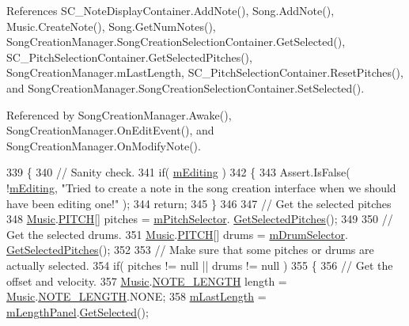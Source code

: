 References S\+C\+\_\+\+Note\+Display\+Container.\+Add\+Note(), Song.\+Add\+Note(), Music.\+Create\+Note(), Song.\+Get\+Num\+Notes(), Song\+Creation\+Manager.\+Song\+Creation\+Selection\+Container.\+Get\+Selected(), S\+C\+\_\+\+Pitch\+Selection\+Container.\+Get\+Selected\+Pitches(), Song\+Creation\+Manager.\+m\+Last\+Length, S\+C\+\_\+\+Pitch\+Selection\+Container.\+Reset\+Pitches(), and Song\+Creation\+Manager.\+Song\+Creation\+Selection\+Container.\+Set\+Selected().



Referenced by Song\+Creation\+Manager.\+Awake(), Song\+Creation\+Manager.\+On\+Edit\+Event(), and Song\+Creation\+Manager.\+On\+Modify\+Note().


\begin{DoxyCode}
339     \{
340         \textcolor{comment}{// Sanity check.}
341         \textcolor{keywordflow}{if}( \hyperlink{group___s_c_m_priv_var_gad2a61787c63fb8770d3c8100adfae9cf}{mEditing} )
342         \{
343             Assert.IsFalse( !\hyperlink{group___s_c_m_priv_var_gad2a61787c63fb8770d3c8100adfae9cf}{mEditing}, \textcolor{stringliteral}{"Tried to create a note in the song creation interface when
       we should have been editing one!"} );
344             \textcolor{keywordflow}{return};
345         \}
346 
347         \textcolor{comment}{// Get the selected pitches}
348         \hyperlink{class_music}{Music}.\hyperlink{group___music_enums_ga508f69b199ea518f935486c990edac1d}{PITCH}[] pitches = \hyperlink{group___s_c_m_priv_var_gab84821120cace4099edfb42c52d2af63}{mPitchSelector}.
      \hyperlink{group___s_c___p_s_c_pub_func_ga05750cc6e1199f1522f8b87d6579dc34}{GetSelectedPitches}();
349 
350         \textcolor{comment}{// Get the selected drums.}
351         \hyperlink{class_music}{Music}.\hyperlink{group___music_enums_ga508f69b199ea518f935486c990edac1d}{PITCH}[] drums = \hyperlink{group___s_c_m_priv_var_gac8be873b8259a0ddf76b4fa6d7d2d072}{mDrumSelector}.
      \hyperlink{group___s_c___p_s_c_pub_func_ga05750cc6e1199f1522f8b87d6579dc34}{GetSelectedPitches}();
352 
353         \textcolor{comment}{// Make sure that some pitches or drums are actually selected.}
354         \textcolor{keywordflow}{if}( pitches != null || drums != null )
355         \{
356             \textcolor{comment}{// Get the offset and velocity.}
357             \hyperlink{class_music}{Music}.\hyperlink{group___music_enums_gaf11b5f079adbb21c800b9eca1c5c3cbd}{NOTE\_LENGTH} length = \hyperlink{class_music}{Music}.\hyperlink{group___music_enums_gaf11b5f079adbb21c800b9eca1c5c3cbd}{NOTE\_LENGTH}.NONE;
358             \hyperlink{group___s_c_m_priv_var_gaa137adb1c99e9ee59adcfbf7d0cf6249}{mLastLength} = \hyperlink{group___s_c_m_priv_var_gadb8dedf80fbe474a1c94cdc95d088a6f}{mLengthPanel}.\hyperlink{group___s_c_m_nest_class_ae73f2b2c2f567ecaf6ce10f85c30956a}{GetSelected}();

\end{DoxyCode}
